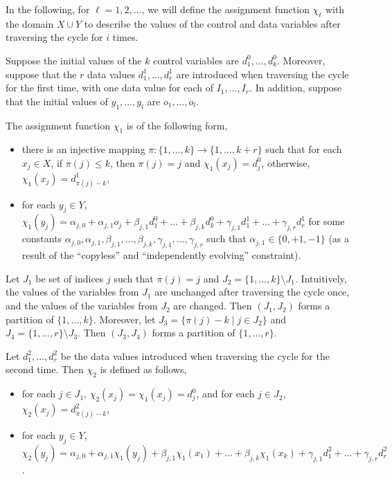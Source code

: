 \documentclass[runningheads,a4paper]{llncs}
\begin{document}
In the following, for $\ell =1,2,\dots$, we will define the assignment function $\chi_\ell$ with the domain $X \cup Y$ to describe the values of the control and data variables after traversing the cycle for $i$ times. 

Suppose the initial values of the $k$ control variables are $d^0_1,\dots,d^0_k$. Moreover, suppose that the $r$ data values $d^1_{1},\dots,d^1_{r}$ are introduced when traversing the cycle for the first time, with one data value for each of $I_{1},\dots,I_{r}$. 
In addition, suppose that the initial values of $y_1,\dots, y_l$ are $o_1,\dots,o_l$. 

The assignment function $\chi_1$ is of the following form,
\begin{itemize}
\item there is an injective mapping $\pi: \{1,\dots,k\} \rightarrow \{1,\dots, k+r\}$ such that for each $x_j \in X$, if $\pi(j) \le k$, then $\pi(j)=j$ and $\chi_1(x_j)=d^0_{j}$, otherwise, $\chi_1(x_j)=d^1_{\pi(j)-k}$,
% 
\item for each $y_j \in Y$, $\chi_1(y_j) = \alpha_{j,0} + \alpha_{j,1} o_j + \beta_{j,1} d^0_1 + \dots + \beta_{j,k} d^0_k + \gamma_{j,1} d^1_1 +\dots + \gamma_{j,r} d^1_{r}$ for some constants $\alpha_{j,0},\alpha_{j,1}, \beta_{j,1},\dots,\beta_{j,k}, \gamma_{j,1},\dots,\gamma_{j,r}$ such that $\alpha_{j,1} \in \{0,+1,-1\}$ (as a result of the ``copyless'' and ``independently evolving'' constraint).
\end{itemize}

Let $J_1$ be set of indices $j$ such that $\pi(j)= j$ and $J_2 = \{1,\dots,k\} \setminus J_1$. Intuitively, the values of the variables from $J_1$ are  unchanged after traversing the cycle once, and the values of the variables from  $J_2$ are changed. Then $(J_1,J_2)$ forms a partition of $\{1,\dots,k\}$. Moreover, let $J_3=\{\pi(j)-k \mid j \in J_2\}$ and $J_4 = \{1,\dots,r\} \setminus J_3$. Then $(J_3,J_4)$ forms a partition of $\{1,\dots,r\}$.

Let $d^2_{1},\dots,d^2_{r}$ be the data values introduced when traversing the cycle for the second time. Then $\chi_2$ is defined as follows,
\begin{itemize}
\item for each $j \in J_1$, $\chi_2(x_j)=\chi_1(x_j)=d^0_j$, and for each $j \in J_2$, $\chi_2(x_j) =d^2_{\pi(j)-k}$, 
%
\item for each $y_j \in Y$, $\chi_2(y_j) = \alpha_{j,0} + \alpha_{j,1} \chi_1(y_j) + \beta_{j,1} \chi_1(x_1) + \dots + \beta_{j,k} \chi_1(x_k) + \gamma_{j,1} d^2_1 +\dots + \gamma_{j,r} d^2_{r}$.
\end{itemize}
\end{document}
